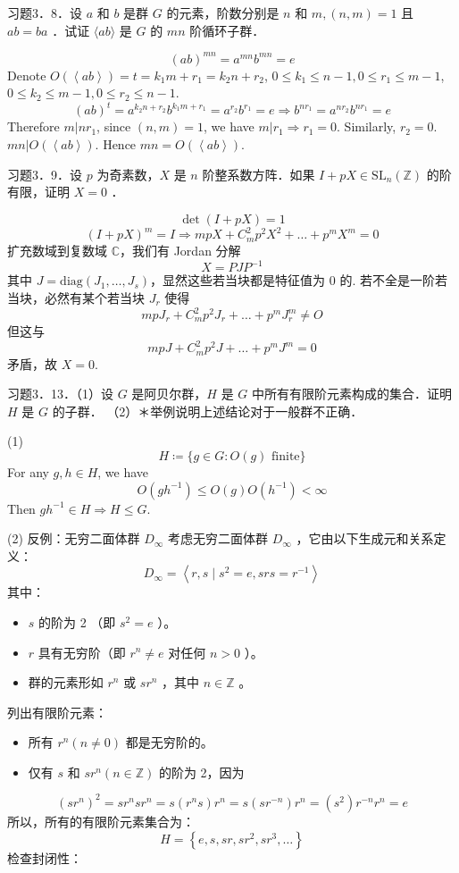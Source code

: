 \begin{exercise}
习题3．8．设 $a$ 和 $b$ 是群 $G$ 的元素，阶数分别是 $n$ 和 $m,(n, m)=1$ 且 $a b=b a$ ．试证 $\langle a b\rangle$ 是 $G$ 的 $m n$ 阶循环子群．
\end{exercise}
\[
(ab)^{mn}=a^{mn}b^{mn}=e
\]
Denote $O (\left< ab \right>)=t=k_1 m+r_1=k_2 n+r_2$, $0\leq k_1\leq n-1,0\leq r_1\leq m-1$, $0\leq k_2\leq m-1,0\leq r_2\leq n-1$.
\[
(ab)^{t}=a^{k_2n+r_2}b^{k_1 m+r_1}=a^{r_2}b^{r_1}=e\Rightarrow b^{nr_1}=a^{nr_2}b^{nr_1}=e
\]
Therefore $m|nr_1$, since $(n,m)=1$, we have $m|r_1\Rightarrow r_1=0$. Similarly, $r_2=0$.  $mn|O(\left< ab \right>)$. Hence $mn=O(\left< ab \right>)$.

\begin{exercise}
习题3．9．设 $p$ 为奇素数，$X$ 是 $n$ 阶整系数方阵．如果 $I+p X \in \mathrm{SL}_n(\mathbb{Z})$ 的阶有限，证明 $X=0$ ．
\end{exercise}
\[
\det(I+pX)=1
\]
\[
(I+pX)^{m}=I\Rightarrow mpX+C^{2}_{m}p^{2}X^{2}+\dots+p^{m}X^{m} =0
\]
扩充数域到复数域 $\mathbb{C}$，我们有 Jordan 分解
\[
X=PJP^{-1}
\]
其中 $J=\mathrm{diag}(J_1,\dots,J_{s})$，显然这些若当块都是特征值为 0 的. 若不全是一阶若当块，必然有某个若当块 $J_{r}$ 使得
\[
mpJ_{r}+C^{2}_{m}p^{2}J_{r}+\dots+p^{m}J_{r}^{m}\neq O
\]
但这与
\[
mpJ+C^{2}_mp^{2}J+\dots+p^{m}J^{m}=0
\]
矛盾，故 $X=0$.

\begin{exercise}
习题3．13．（1）设 $G$ 是阿贝尔群，$H$ 是 $G$ 中所有有限阶元素构成的集合．证明 $H$ 是 $G$ 的子群．
（2）＊举例说明上述结论对于一般群不正确．
\end{exercise}
(1)
\[
H\coloneqq \{ g\in G:O(g)\text{ finite} \}
\]
For any $g, h\in H$, we have
\[
O(gh^{-1})\leq O(g)O(h^{-1})<\infty
\]
Then $gh^{-1}\in H\Rightarrow H\leq G$.

(2)
反例：无穷二面体群 $D_{\infty}$
考虑无穷二面体群 $D_{\infty}$ ，它由以下生成元和关系定义：
\[
D_{\infty}=\left\langle r, s \mid s^2=e, s r s=r^{-1}\right\rangle
\]
其中：

\begin{itemize}
	\item $s$ 的阶为 2 （即 $s^2=e$ ）。
	\item $r$ 具有无穷阶（即 $r^n \neq e$ 对任何 $n>0$ ）。
	\item 群的元素形如 $r^n$ 或 $s r^n$ ，其中 $n \in \mathbb{Z}$ 。
\end{itemize}

列出有限阶元素：

\begin{itemize}
	\item 所有 $r^n(n \neq 0)$ 都是无穷阶的。
	\item 仅有 $s$ 和 $s r^n(n \in \mathbb{Z})$ 的阶为 2，因为
\end{itemize}
\[
\left(s r^n\right)^2=s r^n s r^n=s\left(r^n s\right) r^n=s\left(s r^{-n}\right) r^n=\left(s^2\right) r^{-n} r^n=e
\]
所以，所有的有限阶元素集合为：
\[
H=\left\{e, s, s r, s r^2, s r^3, \ldots\right\}
\]
检查封闭性：

